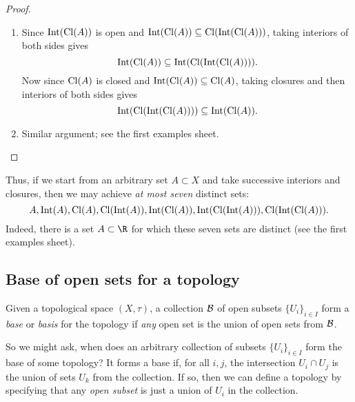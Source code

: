\begin{proof}
\mbox{}
\begin{enumerate}
	\item Since $\operatorname{Int}(\operatorname{Cl}(A))$ is open and $\operatorname{Int}(\operatorname{Cl}(A)) \subseteq \operatorname{Cl}(\operatorname{Int}(\operatorname{Cl}(A)))$, taking interiors of both sides gives
	\begin{equation*}
		\operatorname{Int}(\operatorname{Cl}(A)) \subseteq \operatorname{Int}(\operatorname{Cl}(\operatorname{Int}(\operatorname{Cl}(A)))).
	\end{equation*}
	Now since $\operatorname{Cl}(A)$ is closed and $\operatorname{Int}(\operatorname{Cl}(A)) \subseteq \operatorname{Cl}(A)$, taking closures and then interiors of both sides gives
	\begin{equation*}
		\operatorname{Int}(\operatorname{Cl}(\operatorname{Int}(\operatorname{Cl}(A)))) \subseteq \operatorname{Int}(\operatorname{Cl}(A)).
	\end{equation*}
	\item Similar argument; see the first examples sheet. \qedhere
\end{enumerate}
\end{proof}

Thus, if we start from an arbitrary set $A\subset X$ and take successive interiors and closures, then we may achieve \emph{at most seven} distinct sets:
\begin{equation*}
	A, \operatorname{Int}(A), \operatorname{Cl}(A), \operatorname{Cl}(\operatorname{Int}(A)), \operatorname{Int}(\operatorname{Cl}(A)), \operatorname{Int}(\operatorname{Cl}(\operatorname{Int}(A))), \operatorname{Cl}(\operatorname{Int}(\operatorname{Cl}(A))).
\end{equation*}
Indeed, there is a set $A\subset \R$ for which these seven sets are distinct (see the first examples sheet).


	\pagebreak

\subsection{Base of open sets for a topology} %
\label{sub:base_of_open_sets_for_a_topology}

\begin{definition}
	Given a topological space $(X,\tau)$, a collection $\cal{B}$ of open subsets $\{U_i\}_{i\in I}$ form a \emph{base} or \emph{basis} for the topology if \emph{any} open set is the union of open sets from $\cal{B}$.
\end{definition}

So we might ask, when does an arbitrary collection of subsets $\{U_i\}_{i\in I}$ form the base of some topology? It forms a base if, for all $i,j$, the intersection $U_i \cap U_j$ is the union of sets $U_k$ from the collection. If so, then we can define a topology by specifying that any \emph{open subset} is just a union of $U_i$ in the collection.

